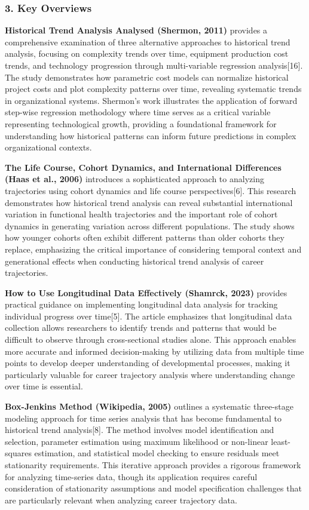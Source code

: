 \documentclass[./main.tex]{subfiles}
\begin{document}
\subsubsection{3. Key Overviews}\label{key-overviews}

\textbf{Historical Trend Analysis Analysed (Shermon, 2011)} provides a
comprehensive examination of three alternative approaches to historical
trend analysis, focusing on complexity trends over time, equipment
production cost trends, and technology progression through
multi-variable regression analysis{[}16{]}. The study demonstrates how
parametric cost models can normalize historical project costs and plot
complexity patterns over time, revealing systematic trends in
organizational systems. Shermon's work illustrates the application of
forward step-wise regression methodology where time serves as a critical
variable representing technological growth, providing a foundational
framework for understanding how historical patterns can inform future
predictions in complex organizational contexts.

\textbf{The Life Course, Cohort Dynamics, and International Differences
(Haas et al., 2006)} introduces a sophisticated approach to analyzing
trajectories using cohort dynamics and life course perspectives{[}6{]}.
This research demonstrates how historical trend analysis can reveal
substantial international variation in functional health trajectories
and the important role of cohort dynamics in generating variation across
different populations. The study shows how younger cohorts often exhibit
different patterns than older cohorts they replace, emphasizing the
critical importance of considering temporal context and generational
effects when conducting historical trend analysis of career
trajectories.

\textbf{How to Use Longitudinal Data Effectively (Shamrck, 2023)}
provides practical guidance on implementing longitudinal data analysis
for tracking individual progress over time{[}5{]}. The article
emphasizes that longitudinal data collection allows researchers to
identify trends and patterns that would be difficult to observe through
cross-sectional studies alone. This approach enables more accurate and
informed decision-making by utilizing data from multiple time points to
develop deeper understanding of developmental processes, making it
particularly valuable for career trajectory analysis where understanding
change over time is essential.

\textbf{Box-Jenkins Method (Wikipedia, 2005)} outlines a systematic
three-stage modeling approach for time series analysis that has become
fundamental to historical trend analysis{[}8{]}. The method involves
model identification and selection, parameter estimation using maximum
likelihood or non-linear least-squares estimation, and statistical model
checking to ensure residuals meet stationarity requirements. This
iterative approach provides a rigorous framework for analyzing
time-series data, though its application requires careful consideration
of stationarity assumptions and model specification challenges that are
particularly relevant when analyzing career trajectory data.
\end{document}
